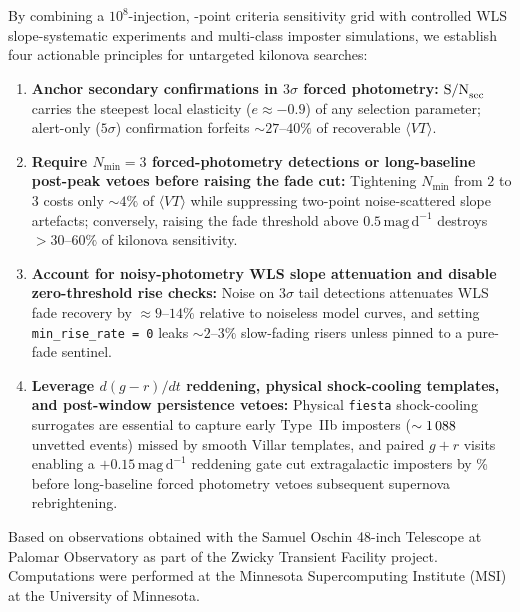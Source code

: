 \documentclass[twocolumn]{aastex631}
\newcommand{\vteff}{\langle VT\rangle}
\begin{document}
By combining a $10^8$-injection, \GridPointsTotal{}-point criteria sensitivity grid with controlled WLS slope-systematic experiments and multi-class imposter simulations, we establish four actionable principles for untargeted kilonova searches:
\begin{enumerate}
    \item \textbf{Anchor secondary confirmations in $3\sigma$ forced photometry:} $\mathrm{S/N}_{\rm sec}$ carries the steepest local elasticity ($e \approx -0.9$) of any selection parameter; alert-only ($5\sigma$) confirmation forfeits $\sim 27$--$40\%$ of recoverable $\vteff$.
    \item \textbf{Require $N_{\min} = 3$ forced-photometry detections or long-baseline post-peak vetoes before raising the fade cut:} Tightening $N_{\min}$ from $2$ to $3$ costs only $\sim 4\%$ of $\vteff$ while suppressing two-point noise-scattered slope artefacts; conversely, raising the fade threshold above $0.5\,\mathrm{mag\,d}^{-1}$ destroys $>30$--$60\%$ of kilonova sensitivity.
    \item \textbf{Account for noisy-photometry WLS slope attenuation and disable zero-threshold rise checks:} Noise on $3\sigma$ tail detections attenuates WLS fade recovery by $\approx 9$--$14\%$ relative to noiseless model curves, and setting \texttt{min\_rise\_rate = 0} leaks $\sim 2$--$3\%$ slow-fading risers unless pinned to a pure-fade sentinel.
    \item \textbf{Leverage $d(g-r)/dt$ reddening, physical shock-cooling templates, and post-window persistence vetoes:} Physical \texttt{fiesta} shock-cooling surrogates are essential to capture early Type~IIb imposters ($\sim 1\,088{}$ unvetted events) missed by smooth Villar templates, and paired $g+r$ visits enabling a $+0.15\,\mathrm{mag\,d}^{-1}$ reddening gate cut extragalactic imposters by \ImpRedGateReductionPct{}\% before long-baseline forced photometry vetoes subsequent supernova rebrightening.
\end{enumerate}

\begin{acknowledgments}
Based on observations obtained with the Samuel Oschin 48-inch Telescope at Palomar Observatory as part of the Zwicky Transient Facility project. Computations were performed at the Minnesota Supercomputing Institute (MSI) at the University of Minnesota.
\end{acknowledgments}

\end{document}
